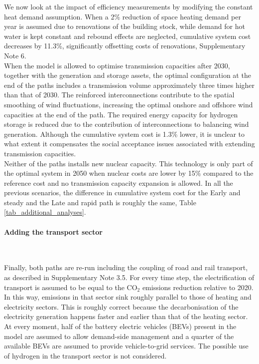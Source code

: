 \documentclass[5p]{elsarticle} %
\begin{document}
We now look at the impact of efficiency measurements by modifying the constant heat demand assumption. When a 2\% reduction of space heating demand per year is assumed due to renovations of the building stock, while demand for hot water is kept constant and rebound effects are neglected, cumulative system cost decreases by 11.3\%, significantly offsetting costs of renovations, Supplementary Note 6. \\


When the model is allowed to optimise transmission capacities after 2030, together with the generation and storage assets, the optimal configuration at the end of the paths includes a transmission volume approximately three times higher than that of 2030. The reinforced interconnections contribute to the spatial smoothing of wind fluctuations, increasing the optimal onshore and offshore wind capacities at the end of the path. The required energy capacity for hydrogen storage is reduced due to the contribution of interconnections to balancing wind generation. Although the cumulative system cost is 1.3\% lower, it is unclear to what extent it compensates the social acceptance issues associated with extending transmission capacities. \\

Neither of the paths installs new nuclear capacity. This technology is only part of the optimal system in 2050 when nuclear costs are lower by 15\% compared to the reference cost and no transmission capacity expansion is allowed. In all the previous scenarios, the difference in cumulative system cost for the Early and steady and the Late and rapid path is roughly the same, Table \ref{tab_additional_analyses}.


\paragraph{\textbf{Adding the transport sector}} \

Finally, both paths are re-run including the coupling of road and rail transport, as described in Supplementary Note 3.5. For every time step, the electrification of transport is assumed to be equal to the CO$_2$ emissions reduction relative to 2020. In this way, emissions in that sector sink roughly parallel to those of heating and electricity sectors. This is roughly correct because the decarbonisation of the electricity generation happens faster and earlier than that of the heating sector. At every moment, half of the battery electric vehicles (BEVs) present in the model are assumed to allow demand-side management and a quarter of the available BEVs are assumed to provide vehicle-to-grid services. The possible use of hydrogen in the transport sector is not considered.\\
\end{document}
